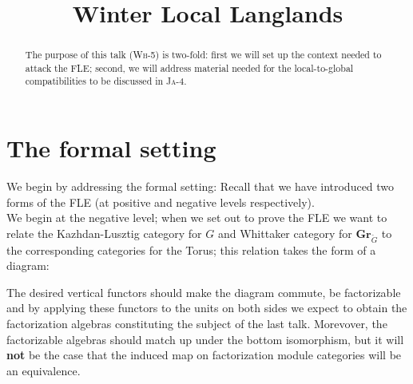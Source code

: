 \documentclass[12pt]{amsart}
\title{Winter Local Langlands \textsc{\Wh{5}}}
\newcommand\Wh[1]{\textsc{Wh}-#1}
\newcommand\Ja[1]{\textsc{Ja}-#1}
\newcommand\Gr{\mathbf{Gr}}
\newcommand\KL{\mathbf{KL}}
\newcommand\Whit{\mathbf{Whit}}
\newcommand\neglv{-\kappa}
\newcommand\dneglv{-\check{\kappa}}
\begin{document}

\begin{abstract}The purpose of this talk (\Wh{5}) is two-fold: first we will set
up the context needed to attack the FLE; second, we will address material needed
for the local-to-global compatibilities to be discussed in \Ja{4}.\end{abstract}

  \maketitle




\section{The formal setting}

  We begin by addressing the formal setting: Recall that we have introduced two
  forms of the FLE (at positive and negative levels
  respectively).\\


  We begin at the negative level\footnotemark; when we set out to prove the FLE
  we want to relate the Kazhdan-Lusztig category for $G$ and Whittaker category
  for $\Gr_{\check{G}}$ to the corresponding categories for the Torus; this
  relation takes the form of a diagram:



  The desired vertical functors should make the diagram commute, be factorizable
  and by applying these functors to the units on both sides we expect to obtain
  the factorization algebras constituting the subject of the last talk.
  Morevover, the factorizable algebras should match up under the bottom
  isomorphism, but it will \textbf{not} be the case that the induced map on
  factorization module categories will be an equivalence.
\end{document}
